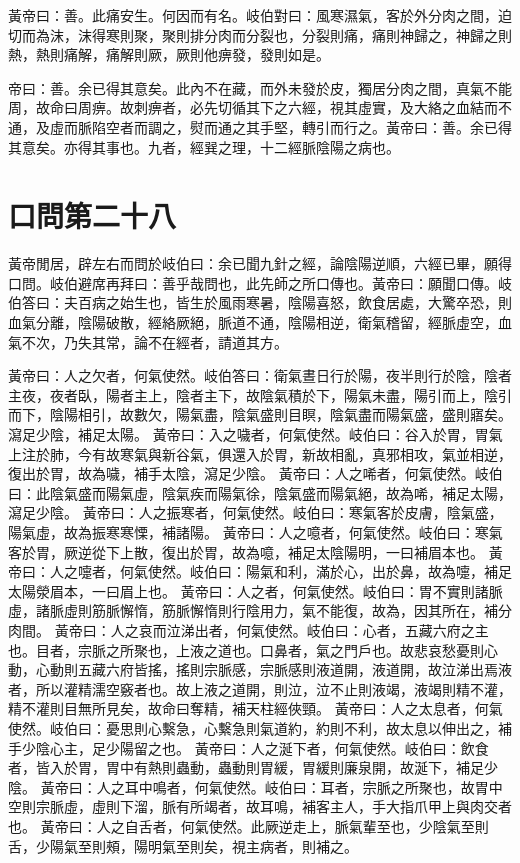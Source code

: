 黃帝曰：善。此痛安生。何因而有名。岐伯對曰：風寒濕氣，客於外分肉之間，迫切而為沫，沫得寒則聚，聚則排分肉而分裂也，分裂則痛，痛則神歸之，神歸之則熱，熱則痛解，痛解則厥，厥則他痹發，發則如是。

帝曰：善。余已得其意矣。此內不在藏，而外未發於皮，獨居分肉之間，真氣不能周，故命曰周痹。故刺痹者，必先切循其下之六經，視其虛實，及大絡之血結而不通，及虛而脈陷空者而調之，熨而通之其手堅，轉引而行之。黃帝曰：善。余已得其意矣。亦得其事也。九者，經巽之理，十二經脈陰陽之病也。




\section{口問第二十八}

黃帝閒居，辟左右而問於岐伯曰：余已聞九針之經，論陰陽逆順，六經已畢，願得口問。岐伯避席再拜曰：善乎哉問也，此先師之所口傳也。黃帝曰：願聞口傳。岐伯答曰：夫百病之始生也，皆生於風雨寒暑，陰陽喜怒，飲食居處，大驚卒恐，則血氣分離，陰陽破散，經絡厥絕，脈道不通，陰陽相逆，衛氣稽留，經脈虛空，血氣不次，乃失其常，論不在經者，請道其方。

黃帝曰：人之欠者，何氣使然。岐伯答曰：衛氣晝日行於陽，夜半則行於陰，陰者主夜，夜者臥，陽者主上，陰者主下，故陰氣積於下，陽氣未盡，陽引而上，陰引而下，陰陽相引，故數欠，陽氣盡，陰氣盛則目瞑，陰氣盡而陽氣盛，盛則寤矣。瀉足少陰，補足太陽。
黃帝曰：入之噦者，何氣使然。岐伯曰：谷入於胃，胃氣上注於肺，今有故寒氣與新谷氣，俱還入於胃，新故相亂，真邪相攻，氣並相逆，復出於胃，故為噦，補手太陰，瀉足少陰。
黃帝曰：人之唏者，何氣使然。岐伯曰：此陰氣盛而陽氣虛，陰氣疾而陽氣徐，陰氣盛而陽氣絕，故為唏，補足太陽，瀉足少陰。
黃帝曰：人之振寒者，何氣使然。岐伯曰：寒氣客於皮膚，陰氣盛，陽氣虛，故為振寒寒慄，補諸陽。
黃帝曰：人之噫者，何氣使然。岐伯曰：寒氣客於胃，厥逆從下上散，復出於胃，故為噫，補足太陰陽明，一曰補眉本也。
黃帝曰：人之嚏者，何氣使然。岐伯曰：陽氣和利，滿於心，出於鼻，故為嚏，補足太陽滎眉本，一曰眉上也。
黃帝曰：人之者，何氣使然。岐伯曰：胃不實則諸脈虛，諸脈虛則筋脈懈惰，筋脈懈惰則行陰用力，氣不能復，故為，因其所在，補分肉間。
黃帝曰：人之哀而泣涕出者，何氣使然。岐伯曰：心者，五藏六府之主也。目者，宗脈之所聚也，上液之道也。口鼻者，氣之門戶也。故悲哀愁憂則心動，心動則五藏六府皆搖，搖則宗脈感，宗脈感則液道開，液道開，故泣涕出焉液者，所以灌精濡空竅者也。故上液之道開，則泣，泣不止則液竭，液竭則精不灌，精不灌則目無所見矣，故命曰奪精，補天柱經俠頸。
黃帝曰：人之太息者，何氣使然。岐伯曰：憂思則心繫急，心繫急則氣道約，約則不利，故太息以伸出之，補手少陰心主，足少陽留之也。
黃帝曰：人之涎下者，何氣使然。岐伯曰：飲食者，皆入於胃，胃中有熱則蟲動，蟲動則胃緩，胃緩則廉泉開，故涎下，補足少陰。
黃帝曰：人之耳中鳴者，何氣使然。岐伯曰：耳者，宗脈之所聚也，故胃中空則宗脈虛，虛則下溜，脈有所竭者，故耳鳴，補客主人，手大指爪甲上與肉交者也。
黃帝曰：人之自舌者，何氣使然。此厥逆走上，脈氣輩至也，少陰氣至則舌，少陽氣至則頰，陽明氣至則矣，視主病者，則補之。


